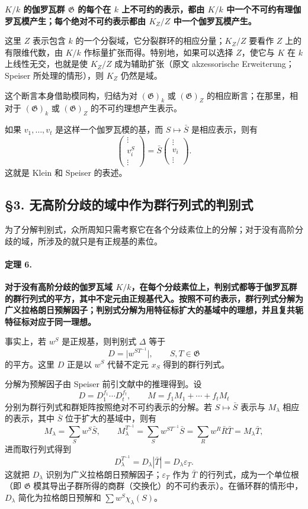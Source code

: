 \documentclass[11pt]{article}
\newcommand{\Gg}{\mathfrak G}
\newcommand{\srcemph}[1]{\textbf{#1}}
\begin{document}
\srcemph{\(K/k\) 的伽罗瓦群 \(\Gg\) 的每个在 \(k\) 上不可约的表示，都由 \(K/k\) 中一个不可约有理伽罗瓦模产生；每个绝对不可约表示都由 \(K_Z/Z\) 中一个伽罗瓦模产生。}

这里 \(Z\) 表示包含 \(k\) 的一个分裂域，它分裂群环的相应分量；\(K_Z/Z\) 要看作 \(Z\) 上的有限维代数，由 \(K/k\) 作标量扩张而得。特别地，如果可以选择 \(Z\)，使它与 \(K\) 在 \(k\) 上线性无交，也就是使 \(K_Z/Z\) 成为辅助扩张（原文 akzessorische Erweiterung；Speiser 所处理的情形），则 \(K_Z\) 仍然是域。

这个断言本身借助模同构，归结为对 \((\Gg)_k\) 或 \((\Gg)_Z\) 的相应断言；在那里，相对于 \((\Gg)_k\) 或 \((\Gg)_Z\) 的不可约理想产生表示。

如果 \(v_1,\ldots,v_t\) 是这样一个伽罗瓦模的基，而 \(S\mapsto \bar S\) 是相应表示，则有
\[
        \begin{pmatrix}\vdots\\ v_i^S\\ \vdots\end{pmatrix}
        =\bar S\begin{pmatrix}\vdots\\ v_i\\ \vdots\end{pmatrix}.
\]
这就是 Klein 和 Speiser 的表述。

\subsection*{§3. 无高阶分歧的域中作为群行列式的判别式}

为了分解判别式，众所周知只需考察它在各个分歧素位上的分解；对于没有高阶分歧的域，所涉及的就只是有正规基的素位。

\paragraph{定理 6.}
\srcemph{对于没有高阶分歧的伽罗瓦域 \(K/k\)，在每个分歧素位上，判别式都等于伽罗瓦群的群行列式的平方，其中不定元由正规基代入。按照不可约表示，群行列式分解为广义拉格朗日预解因子；判别式分解为用特征标扩大的基域中的理想，并且复共轭特征标对应于同一理想。}

事实上，若 \(w^S\) 是正规基，则判别式 \(\Delta\) 等于
\[
        D=\bigl|w^{ST^{-1}}\bigr|,\qquad S,T\in\Gg
\]
的平方。这里 \(D\) 正是以 \(w^S\) 代替不定元 \(x_S\) 得到的群行列式。

分解为预解因子由 Speiser 前引文献中的推理得到。设
\[
        D=D_1^{f_1}\cdots D_t^{f_t},
        \qquad
        M=f_1M_1+\cdots+f_tM_t
\]
分别为群行列式和群矩阵按照绝对不可约表示的分解。若 \(S\mapsto\bar S\) 表示与 \(M_\lambda\) 相应的表示，其中 \(\bar S\) 位于扩大的基域中，则有
\[
        M_\lambda=\sum_S w^S\bar S,
        \qquad
        M_\lambda^{T^{-1}}=\sum_S w^{ST^{-1}}\bar S
          =\sum_R w^R\bar R\bar T=M_\lambda\bar T,
\]
进而取行列式得到
\[
        D_\lambda^{T^{-1}}=D_\lambda|\bar T|=D_\lambda\varepsilon_T.
\]
这就把 \(D_\lambda\) 识别为广义拉格朗日预解因子；\(\varepsilon_T\) 作为 \(\bar T\) 的行列式，成为一个单位根（即 \(\Gg\) 模其导出子群所得的商群（交换化）的不可约表示）。在循环群的情形中，\(D_\lambda\) 简化为拉格朗日预解和 \(\sum w^S\chi_\lambda(S)\)。
\end{document}
